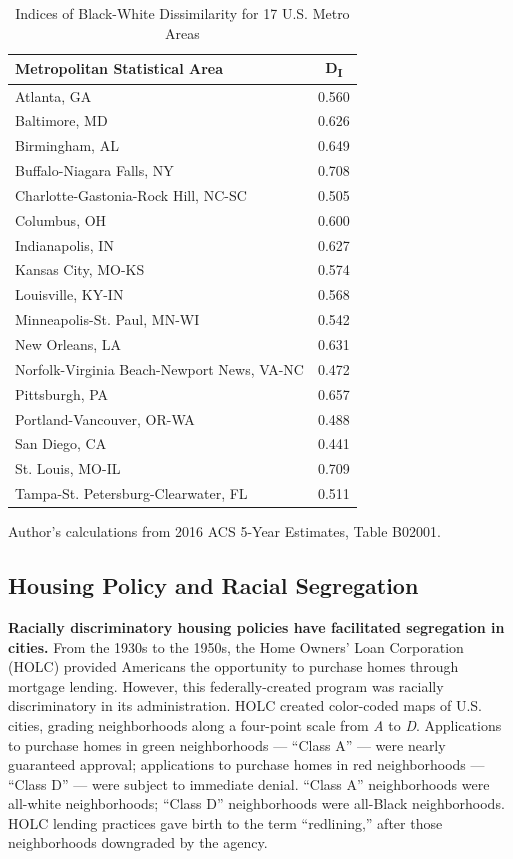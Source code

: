 \documentclass[paper=letter, fontsize=12pt]{scrartcl} %
\begin{document}
\begin{table}[h]
	\caption{Indices of Black-White Dissimilarity for 17 U.S. Metro Areas}
	\begin{center}
		\begin{tabular}{||l | c||}
			\hline
			\textbf{Metropolitan Statistical Area} & \textbf{D\textsubscript{I}} \\
			\hline \hline
			Atlanta, GA & 0.560 \\
			\hline
			Baltimore, MD & 0.626 \\
			\hline
			Birmingham, AL & 0.649 \\
			\hline
			Buffalo-Niagara Falls, NY & 0.708 \\
			\hline
			Charlotte-Gastonia-Rock Hill, NC-SC & 0.505 \\
			\hline
			Columbus, OH & 0.600 \\
			\hline
			Indianapolis, IN & 0.627 \\
			\hline
			Kansas City, MO-KS & 0.574 \\
			\hline
			Louisville, KY-IN & 0.568 \\
			\hline
			Minneapolis-St. Paul, MN-WI & 0.542 \\
			\hline
			New Orleans, LA & 0.631 \\
			\hline
			Norfolk-Virginia Beach-Newport News, VA-NC & 0.472 \\
			\hline
			Pittsburgh, PA & 0.657 \\
			\hline
			Portland-Vancouver, OR-WA & 0.488 \\
			\hline
			San Diego, CA & 0.441 \\
			\hline
			St. Louis, MO-IL & 0.709 \\
			\hline
			Tampa-St. Petersburg-Clearwater, FL & 0.511 \\
			\hline
		\end{tabular}
	\end{center}
Author's calculations from 2016 ACS 5-Year Estimates, Table B02001.
\end{table}

\subsection{Housing Policy and Racial Segregation}
\textbf{Racially discriminatory housing policies have facilitated segregation in cities.} From the 1930s to the 1950s, the Home Owners' Loan Corporation (HOLC) provided Americans the opportunity to purchase homes through mortgage lending. However, this federally-created program was racially discriminatory in its administration. HOLC created color-coded maps of U.S. cities, grading neighborhoods along a four-point scale from \textit{A} to \textit{D}. Applications to purchase homes in green neighborhoods --- ``Class A'' --- were nearly guaranteed approval; applications to purchase homes in red neighborhoods --- ``Class D'' --- were subject to immediate denial. ``Class A'' neighborhoods were all-white neighborhoods; ``Class D'' neighborhoods were all-Black neighborhoods. HOLC lending practices gave birth to the term ``redlining,'' after those neighborhoods downgraded by the agency.\par
\end{document}
